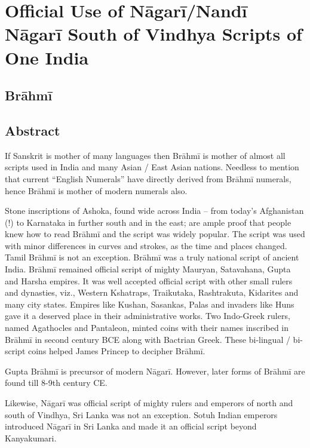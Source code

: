 
\chapter{Official Use of Nāgarī/Nandī Nāgarī South of Vindhya Scripts of One India}



\section*{Brāhmī}


\section*{Abstract}

If Sanskrit is mother of many languages then Brāhmī is mother of almost all scripts used in India and many Asian / East Asian nations. Needless to mention that current “English Numerals” have directly derived from Brāhmī numerals, hence Brāhmī is mother of modern numerals also.

Stone inscriptions of Ashoka, found wide across India – from today’s Afghanistan (!) to Karnataka in further south and in the east; are ample proof that people knew how to read Brāhmī and the script was widely popular. The script was used with minor differences in curves and strokes, as the time and places changed. Tamil Brāhmī is not an exception. Brāhmī was a truly national script of ancient India. Brāhmī remained official script of mighty Mauryan, Satavahana, Gupta and Harsha empires. It was well accepted official script with other small rulers and dynasties, viz., Western Kshatraps, Traikutaka, Rashtrakuta, Kidarites and many city states. Empires like Kushan, Sasankas, Palas and invaders like Huns gave it a deserved place in their administrative works. Two Indo-Greek rulers, named Agathocles and Pantaleon, minted coins with their names inscribed in Brāhmī in second century BCE along with Bactrian Greek. These bi-lingual / bi-script coins helped James Princep to decipher Brāhmī.

Gupta Brāhmī is precursor of modern Nāgarī. However, later forms of Brāhmī are found till 8-9th century CE.

Likewise, Nāgarī was official script of mighty rulers and emperors of north and south of Vindhya, Sri Lanka was not an exception. Sotuh Indian emperors introduced Nāgarī in Sri Lanka and made it an official script beyond Kanyakumari.

